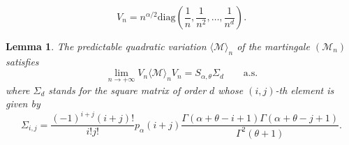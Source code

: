 \documentclass[twoside,12pt]{article}
\newcommand{\cM}{\mathcal{M}}
\newtheorem{lem}[thm]{Lemma}
\begin{document}
\begin{equation}
\label{DEFmatrixVN}
V_{n}=n^{\alpha/2} \text{diag}\left(\frac{1}{n}, \frac{1}{n^2}, \ldots, \frac{1}{n^d}\right).
\end{equation}

\begin{lem}
\label{L-KEYMATRIX}
The predictable quadratic variation $\langle \cM\rangle_{n}$ of the martingale $(\cM_{n})$ satisfies
\begin{equation}
\label{LIMmatrixMd}
\lim_{n\rightarrow+\infty}V_{n}\langle \cM\rangle_{n}V_{n}= S_{\alpha,\theta} \Sigma_d \qquad\text{a.s.}
\end{equation}
where $\Sigma_d$ stands for the square matrix of order $d$ whose $(i,j)$-th element is given by
\begin{equation}
\label{Sigmaij}
\Sigma_{i,j}=\frac{(-1)^{i+j} (i+j)!}{i!j!}p_\alpha(i+j)\frac{\Gamma(\alpha+\theta-i+1) \Gamma(\alpha+\theta-j+1)}{\Gamma^2(\theta+1)}.
\end{equation}
\end{lem}
\end{document}
